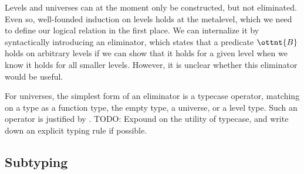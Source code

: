 \documentclass[a4paper,UKenglish,cleveref,autoref,thm-restate]{lipics-v2021}
\begin{document}
Levels and universes can at the moment only be constructed, but not eliminated.
Even so, well-founded induction on levels holds at the metalevel,
which we need to define our logical relation in the first place.
We can internalize it by syntactically introducing an eliminator,
which states that a predicate $\ottnt{B}$ holds on arbitrary levels
if we can show that it holds for a given level
when we know it holds for all smaller levels.
However, it is unclear whether this eliminator would be useful.
%

For universes, the simplest form of an eliminator is a typecase operator,
matching on a type as a function type, the empty type, a universe, or a level type.
Such an operator is justified by .
TODO: Expound on the utility of typecase,
and write down an explicit typing rule if possible.

\subsection{Subtyping} \label{sec:subtyping}
\end{document}
